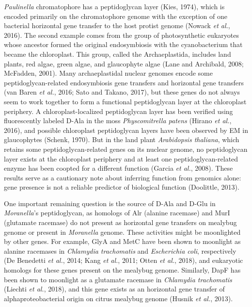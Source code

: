 \documentclass[11pt]{article}
\begin{document}
\begin{sloppypar}
\textit{Paulinella} chromatophore has a peptidoglycan layer (Kies, 1974), which is encoded primarily on the chromatophore genome with the exception of one bacterial horizontal gene transfer to the host protist genome (Nowack \textit{et al.}, 2016). 
The second example comes from the group of photosynthetic eukaryotes whose ancestor formed the original endosymbiosis with the cyanobacterium that became the chloroplast. 
This group, called the Archaeplastida, includes land plants, red algae, green algae, and glaucophyte algae (Lane and Archibald, 2008; McFadden, 2001). 
Many archaeplastidal nuclear genomes encode some peptidoglycan-related endosymbiosis gene transfers and horizontal gene transfers (van Baren \textit{et al.}, 2016; Sato and Takano, 2017), but these genes do not always seem to work together to form a functional peptidoglycan layer at the chloroplast periphery. 
A chloroplast-localized peptidoglycan layer has been verified using fluorescently labeled D-Ala in the moss \textit{Physcomitrella patens} (Hirano \textit{et al.}, 2016), and possible chloroplast peptidoglycan layers have been observed by EM in glaucophytes (Schenk, 1970). 
But in the land plant \textit{Arabidopsis thaliana}, which retains some peptidoglycan-related genes on its nuclear genome, no peptidoglycan layer exists at the chloroplast periphery and at least one peptidoglycan-related enzyme has been coopted for a different function (Garcia \textit{et al.}, 2008). 
These results serve as a cautionary note about inferring function from genomics alone: gene presence is not a reliable predictor of biological function (Doolittle, 2013).
\par
One important remaining question is the source of D-Ala and D-Glu in \textit{Moranella}’s peptidoglycan, as homologs of Alr (alanine racemase) and MurI (glutamate racemase) do not present as horizontal gene transfers on mealybug genome or present in \textit{Moranella} genome. 
These activities might be moonlighted by other genes. 
For example, GlyA and MetC have been shown to moonlight as alanine racemases in \textit{Chlamydia trachomatis} and \textit{Escherichia coli}, respectively (De Benedetti \textit{et al.}, 2014; Kang \textit{et al.}, 2011; Otten \textit{et al.}, 2018), and eukaryotic homologs for these genes present on the mealybug genome. 
Similarly, DapF has been shown to moonlight as a glutamate racemase in \textit{Chlamydia trachomatis} (Liechti \textit{et al.}, 2018), and this gene exists as an horizontal gene transfer of alphaproteobacterial origin on citrus mealybug genome (Husnik \textit{et al.}, 2013). 

\end{sloppypar}
\end{document}
